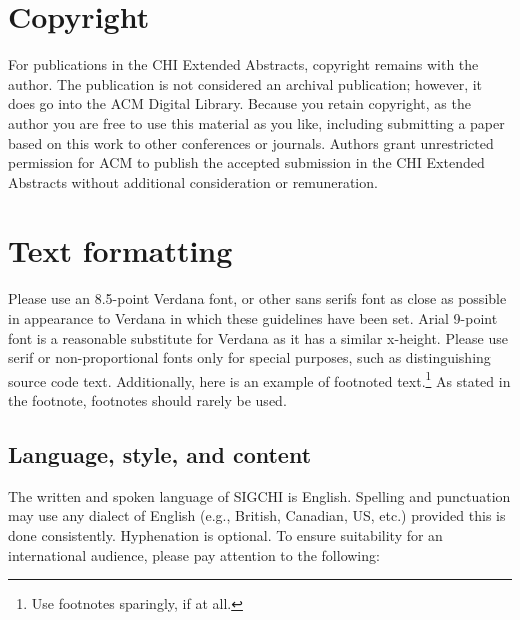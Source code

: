 \documentclass{chi-ext}
\begin{document}
\section{Copyright}
For publications in the CHI Extended Abstracts, copyright remains with the author.  
The publication is not considered an archival publication; however, it does go into the ACM Digital Library. 
Because you retain copyright, as the author you are free to use this material as you like, including submitting a paper based on this work to other conferences or journals.  
Authors grant unrestricted permission for ACM to publish the accepted submission in the CHI Extended Abstracts without additional consideration or remuneration.

\section{Text formatting}
Please use an 8.5-point Verdana font, or other sans serifs font as close as possible in appearance to Verdana in which these guidelines have been set. 
Arial 9-point font is a reasonable substitute for Verdana as it has a similar x-height. 
Please use serif or non-proportional fonts only for special purposes, such as distinguishing source code text.
Additionally, here is an example of footnoted text.\footnote{Use footnotes sparingly, if at all.}
As stated in the footnote, footnotes should rarely be used.

\subsection{Language, style, and content}
The written and spoken language of SIGCHI is English. 
Spelling and punctuation may use any dialect of English (e.g., British, Canadian, US, etc.) provided this is done consistently. 
Hyphenation is optional. 
To ensure suitability for an international audience, please pay attention to the following:
\end{document}
